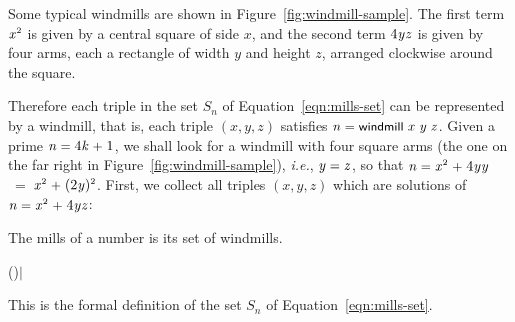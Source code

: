 \documentclass[sigplan,screen]{acmart}
\newcommand{\m}[1]{\todo[fancyline,color=blue!40,size=\scriptsize]{\textsf{JC: #1}}} %
\newcommand{\ie}{\textit{i.e.}}
\newcommand{\ee}{\ \HOLConst{=}\ } %
\renewcommand{\HOLinline}[1]{\ensuremath{#1}} %
\renewcommand{\HOLConst}[1]{{\fontsize{9pt}{1em}\selectfont\textsf{\upshape #1}}}
\renewcommand{\HOLNumLit}[1]{{\selectfont\textrm{\upshape #1}}} %
\renewcommand{\HOLSymConst}[1]{{\fontsize{9pt}{1em}\selectfont\textsf{\upshape #1}}}
\renewcommand{\HOLTokenBar}{\ensuremath{\mid}}
\begin{document}
\noindent
Some typical windmills are shown in Figure~\ref{fig:windmill-sample}.
The first term \HOLinline{\HOLFreeVar{x}\HOLSymConst{\ensuremath{\sp{2}}}} is given by a central square of side $x$,
and the second term \HOLinline{\HOLNumLit{4}\HOLSymConst{\ensuremath{}}\HOLFreeVar{y}\HOLSymConst{\ensuremath{}}\HOLFreeVar{z}} is given by four arms, each a rectangle of width $y$ and height $z$, arranged clockwise around the square.

Therefore each triple in the set $S_{n}$ of Equation~\eqref{eqn:mills-set} can be represented by a windmill, that is,
each triple $(x,y,z)$ satisfies \HOLinline{\HOLFreeVar{n}\;\HOLSymConst{=}\;\HOLConst{windmill}\;\HOLFreeVar{x}\;\HOLFreeVar{y}\;\HOLFreeVar{z}}.
Given a prime \HOLinline{\HOLFreeVar{n}\;\HOLSymConst{=}\;\HOLNumLit{4}\HOLSymConst{\ensuremath{}}\HOLFreeVar{k}\;\HOLSymConst{\ensuremath{+}}\;\HOLNumLit{1}},
we shall look for a windmill with four square arms (the one on the far right in Figure~\ref{fig:windmill-sample}),
\ie, \HOLinline{\HOLFreeVar{y}\;\HOLSymConst{=}\;\HOLFreeVar{z}}, so that \HOLinline{\HOLFreeVar{n}\;\HOLSymConst{=}\;\HOLFreeVar{x}\HOLSymConst{\ensuremath{\sp{2}}}\;\HOLSymConst{\ensuremath{+}}\;\HOLNumLit{4}\HOLSymConst{\ensuremath{}}\HOLFreeVar{y}\HOLSymConst{\ensuremath{}}\HOLFreeVar{y}} \ee \HOLinline{\HOLFreeVar{x}\HOLSymConst{\ensuremath{\sp{2}}}\;\HOLSymConst{\ensuremath{+}}\;(\HOLNumLit{2}\HOLSymConst{\ensuremath{}}\HOLFreeVar{y})\HOLSymConst{\ensuremath{\sp{2}}}}.
First, we collect all triples $(x,y,z)$ which are solutions of \HOLinline{\HOLFreeVar{n}\;\HOLSymConst{=}\;\HOLFreeVar{x}\HOLSymConst{\ensuremath{\sp{2}}}\;\HOLSymConst{\ensuremath{+}}\;\HOLNumLit{4}\HOLSymConst{\ensuremath{}}\HOLFreeVar{y}\HOLSymConst{\ensuremath{}}\HOLFreeVar{z}}:
\begin{definition}
\label{def:mills-def}
\noindent
The mills of a number is its set of windmills.
\begin{HOLmath}
\;\;\HOLConst{mills}\;\;\HOLTokenDefEquality{}\;\HOLTokenLeftbrace{}(\HOLBoundVar{x}\HOLSymConst{,}\HOLBoundVar{y}\HOLSymConst{,})\;\HOLTokenBar{}\;\;\HOLSymConst{=}\;\HOLConst{windmill}\;\;\;\HOLTokenRightbrace{}
\end{HOLmath}
\end{definition}
\noindent
This is the formal definition of the set $S_{n}$ of Equation~\eqref{eqn:mills-set}.
\end{document}

